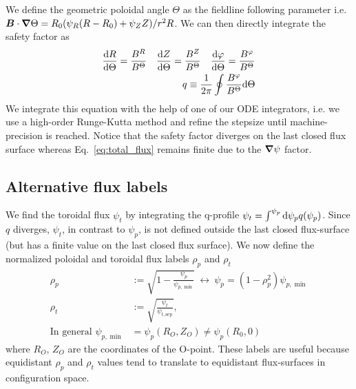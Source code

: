 We define the geometric poloidal angle $\Theta$ as the fieldline following
parameter i.e. ${\boldsymbol{B}}\cdot{\boldsymbol{\nabla}}\Theta = R_0(\psi_R (R-R_0) + \psi_Z Z)/r^2R$.
We can then directly integrate the safety factor as
\begin{align}\label{eq:safety_factor}
\frac{\mathrm{d} R}{\mathrm{d}\Theta} = \frac{B^R}{B^\Theta}\quad
\frac{\mathrm{d} Z}{\mathrm{d}\Theta} = \frac{B^Z}{B^\Theta}\quad
\frac{\mathrm{d} \varphi}{\mathrm{d}\Theta} = \frac{B^\varphi}{B^\Theta}\\
q\equiv\frac{1}{2\pi}\oint \frac{B^\varphi}{B^\Theta} \mathrm{d}\Theta
\end{align}
We integrate this equation with the help of one of our ODE integrators, i.e. we use a high-order Runge-Kutta method
and refine the stepsize until machine-precision is reached.
Notice that the safety factor diverges on the last closed flux
surface whereas Eq.~\eqref{eq:total_flux}
remains finite due to the ${\boldsymbol{\nabla}}\psi$ factor.
\subsection{Alternative flux labels}
We find the toroidal flux $\psi_t$ by integrating the q-profile $\psi_t = \int^{\psi_p} \mathrm{d}\psi_p q(\psi_p)$. Since $q$ diverges, $\psi_t$, in contrast to $\psi_p$,
is not defined outside the last closed flux-surface (but has a finite value on the last closed flux surface). We now define the normalized poloidal and toroidal flux labels $\rho_p$ and $\rho_t$
\begin{align}
    \rho_p&:= \sqrt{1-\frac{\psi_p}{\psi_{p,\min}}} \ \leftrightarrow\ \psi_p = (1-\rho_p^2)\psi_{p,\min} \\
    \rho_t&:= \sqrt{\frac{\psi_t}{\psi_{t,\mathrm{sep}}}},\\
    \text{In general }\psi_{p,\min} &= \psi_p(R_O, Z_O) \neq\psi_{p}(R_0,0)
\end{align}
where $R_O$, $Z_O$ are the coordinates of the O-point.
These labels are useful because
equidistant $\rho_p$ and $\rho_t$ values tend to translate to equidistant flux-surfaces
in configuration space.

